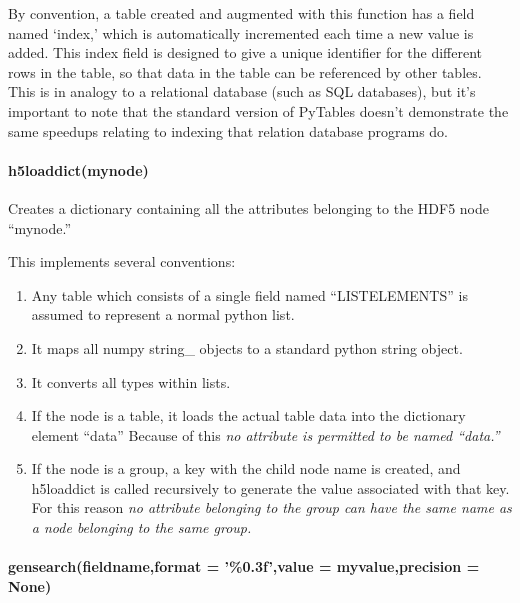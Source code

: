 By convention, a table created and augmented with this function
    has a field named `index,' which is automatically incremented
    each time a new value is added.
This index field is designed to give a unique identifier for
    the different rows in the table, so that data in the table
    can be referenced by other tables.
This is in analogy to a relational database
    (such as SQL databases),
    but it's important to note that the standard version
    of PyTables doesn't demonstrate the same speedups
    relating to indexing that relation database programs do.

\paragraph{h5loaddict(mynode)}
Creates a dictionary containing all the attributes
    belonging to the HDF5 node ``mynode.''

This implements several conventions:
\begin{mykwargs}
    \begin{enumerate}
        \item Any table which consists of a single field
            named ``LISTELEMENTS'' is assumed to represent
            a normal python list.
        \item  It maps all numpy string\_ objects
            to a standard python string object.
        \item It converts all types within lists. 
        \item If the node is a table, it loads the actual
            table data into the dictionary element ``data''
            Because of this \textit{no attribute is permitted
            to be named ``data.''}
        \item If the node is a group, a key with the child node
            name is created, and h5loaddict is called recursively
            to generate the value associated with that key.
            For this reason \textit{no attribute belonging to the
            group can have the same name as a node belonging to the
            same group.}
    \end{enumerate}
\end{mykwargs}
\paragraph{gensearch(fieldname,format = '\%0.3f',value = myvalue,precision = None)}
